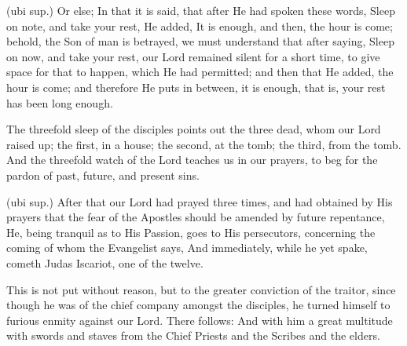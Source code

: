  (ubi sup.) Or else; In that it is said, that after He had spoken these words, Sleep on note, and take your rest, He added, It is enough, and then, the hour is come; behold, the Son of man is betrayed, we must understand that after saying, Sleep on now, and take your rest, our Lord remained silent for a short time, to give space for that to happen, which He had permitted; and then that He added, the hour is come; and therefore He puts in between, it is enough, that is, your rest has been long enough.

 The threefold sleep of the disciples points out the three dead, whom our Lord raised up; the first, in a house; the second, at the tomb; the third, from the tomb. And the threefold watch of the Lord teaches us in our prayers, to beg for the pardon of past, future, and present sins.

 

 (ubi sup.) After that our Lord had prayed three times, and had obtained by His prayers that the fear of the Apostles should be amended by future repentance, He, being tranquil as to His Passion, goes to His persecutors, concerning the coming of whom the Evangelist says, And immediately, while he yet spake, cometh Judas Iscariot, one of the twelve.

 This is not put without reason, but to the greater conviction of the traitor, since though he was of the chief company amongst the disciples, he turned himself to furious enmity against our Lord. There follows: And with him a great multitude with swords and staves from the Chief Priests and the Scribes and the elders.


